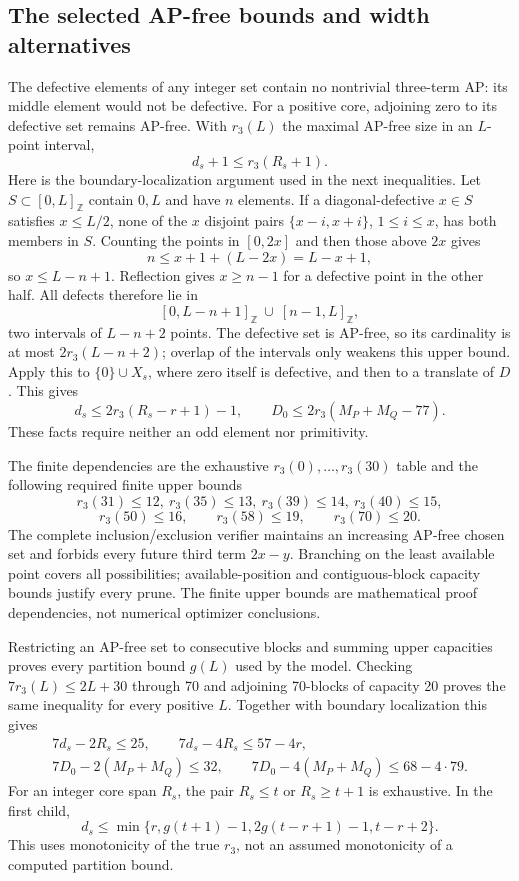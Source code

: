 \documentclass[11pt,a4paper]{article}
\theoremstyle{remark}
\newcommand{\Z}{\mathbb Z}
\begin{document}
\subsection{The selected AP-free bounds and width alternatives}
The defective elements of any integer set contain no nontrivial
three-term AP: its middle element would not be defective. For a
positive core, adjoining zero to its defective set remains AP-free.
With $r_3(L)$ the maximal AP-free size in an $L$-point interval,
\[
 d_s+1\le r_3(R_s+1).
\]
Here is the boundary-localization argument used in the next inequalities.
Let $S\subset[0,L]_{\Z}$ contain $0,L$ and have $n$ elements. If a
diagonal-defective $x\in S$ satisfies $x\le L/2$, none of the $x$
disjoint pairs $\{x-i,x+i\}$, $1\le i\le x$, has both members in $S$.
Counting the points in $[0,2x]$ and then those above $2x$ gives
\[
 n\le x+1+(L-2x)=L-x+1,
\]
so $x\le L-n+1$. Reflection gives $x\ge n-1$ for a defective point
in the other half. All defects therefore lie in
\[
 [0,L-n+1]_{\Z}\ \cup\ [n-1,L]_{\Z},
\]
two intervals of $L-n+2$ points. The defective set is AP-free, so its
cardinality is at most $2r_3(L-n+2)$; overlap of the intervals only
weakens this upper bound. Apply this to $\{0\}\cup X_s$, where zero
itself is defective, and then to a translate of $D$. This gives
\[
 d_s\le2r_3(R_s-r+1)-1,\qquad
 D_0\le2r_3(M_P+M_Q-77).
\]
These facts require neither an odd element nor primitivity.

The finite dependencies are the exhaustive $r_3(0),\ldots,r_3(30)$
table and the following required finite upper bounds
\[
 r_3(31)\le12,\ r_3(35)\le13,\ r_3(39)\le14,\ r_3(40)\le15,
\]
\[
 r_3(50)\le16,\qquad r_3(58)\le19,\qquad r_3(70)\le20.
\]
The complete inclusion/exclusion verifier maintains an increasing
AP-free chosen set and forbids every future third term $2x-y$.
Branching on the least available point covers all possibilities;
available-position and contiguous-block capacity bounds justify every
prune. The finite upper bounds are mathematical proof dependencies,
not numerical optimizer conclusions.



Restricting an AP-free set to consecutive blocks and summing upper
capacities proves every partition bound $g(L)$ used by the model.
Checking $7r_3(L)\le2L+30$ through 70 and adjoining 70-blocks of
capacity 20 proves the same inequality for every positive $L$.
Together with boundary localization this gives
\begin{gather*}
 7d_s-2R_s\le25,\qquad 7d_s-4R_s\le57-4r,\\
 7D_0-2(M_P+M_Q)\le32,\qquad
 7D_0-4(M_P+M_Q)\le68-4\cdot79.
\end{gather*}
For an integer core span $R_s$, the pair $R_s\le t$ or $R_s\ge t+1$
is exhaustive. In the first child,
\[
 d_s\le\min\{r,g(t+1)-1,2g(t-r+1)-1,t-r+2\}.
\]
This uses monotonicity of the true $r_3$, not an assumed monotonicity
of a computed partition bound.
\end{document}

